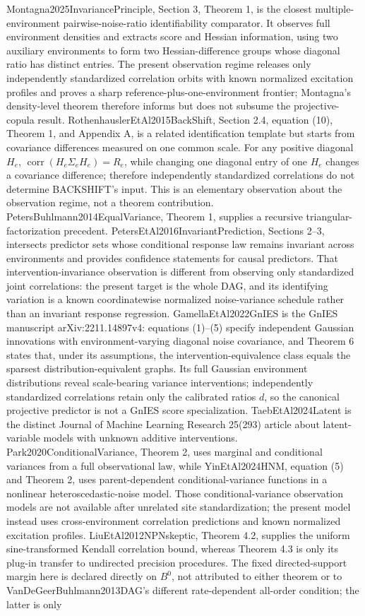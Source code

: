 \documentclass{article}
\begin{document}
Montagna2025InvariancePrinciple, Section 3, Theorem 1, is the closest multiple-environment pairwise-noise-ratio identifiability comparator. It observes full environment densities and extracts score and Hessian information, using two auxiliary environments to form two Hessian-difference groups whose diagonal ratio has distinct entries. The present observation regime releases only independently standardized correlation orbits with known normalized excitation profiles and proves a sharp reference-plus-one-environment frontier; Montagna's density-level theorem therefore informs but does not subsume the projective-copula result. RothenhauslerEtAl2015BackShift, Section 2.4, equation (10), Theorem 1, and Appendix A, is a related identification template but starts from covariance differences measured on one common scale. For any positive diagonal \(H_e\), \(\operatorname{corr}(H_e\Sigma_eH_e)=R_e\), while changing one diagonal entry of one \(H_e\) changes a covariance difference; therefore independently standardized correlations do not determine BACKSHIFT's input. This is an elementary observation about the observation regime, not a theorem contribution. PetersBuhlmann2014EqualVariance, Theorem 1, supplies a recursive triangular-factorization precedent. PetersEtAl2016InvariantPrediction, Sections 2--3, intersects predictor sets whose conditional response law remains invariant across environments and provides confidence statements for causal predictors. That intervention-invariance observation is different from observing only standardized joint correlations: the present target is the whole DAG, and its identifying variation is a known coordinatewise normalized noise-variance schedule rather than an invariant response regression. GamellaEtAl2022GnIES is the GnIES manuscript arXiv:2211.14897v4: equations (1)--(5) specify independent Gaussian innovations with environment-varying diagonal noise covariance, and Theorem 6 states that, under its assumptions, the intervention-equivalence class equals the sparsest distribution-equivalent graphs. Its full Gaussian environment distributions reveal scale-bearing variance interventions; independently standardized correlations retain only the calibrated ratios \(d\), so the canonical projective predictor is not a GnIES score specialization. TaebEtAl2024Latent is the distinct Journal of Machine Learning Research 25(293) article about latent-variable models with unknown additive interventions. Park2020ConditionalVariance, Theorem 2, uses marginal and conditional variances from a full observational law, while YinEtAl2024HNM, equation (5) and Theorem 2, uses parent-dependent conditional-variance functions in a nonlinear heteroscedastic-noise model. Those conditional-variance observation models are not available after unrelated site standardization; the present model instead uses cross-environment correlation predictions and known normalized excitation profiles. LiuEtAl2012NPNskeptic, Theorem 4.2, supplies the uniform sine-transformed Kendall correlation bound, whereas Theorem 4.3 is only its plug-in transfer to undirected precision procedures. The fixed directed-support margin here is declared directly on \(B^0\), not attributed to either theorem or to VanDeGeerBuhlmann2013DAG's different rate-dependent all-order condition; the latter is only 
\end{document}
